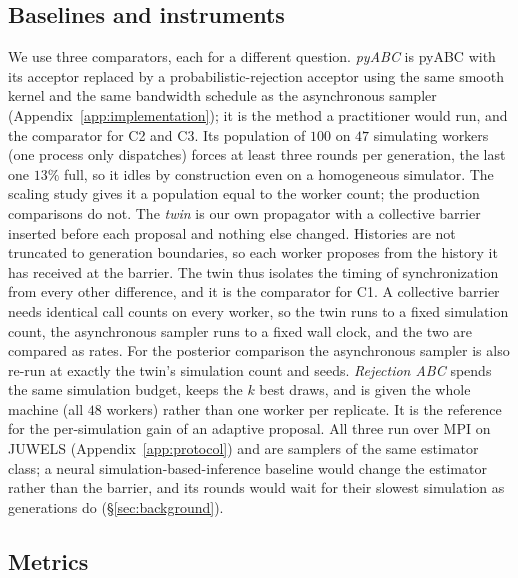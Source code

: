 \documentclass[10pt]{article}
\theoremstyle{plain}
\theoremstyle{definition}
\begin{document}
\subsection{Baselines and instruments}\label{sec:experiments-baselines}\label{sec:implementation}
We use three comparators, each for a different question. \emph{pyABC} is pyABC \citep{klinger2018pyabc,schalte2022pyabc} with its acceptor replaced by a probabilistic-rejection acceptor using the same smooth kernel and the same bandwidth schedule as the asynchronous sampler (Appendix~\ref{app:implementation}); it is the method a practitioner would run, and the comparator for C2 and C3. Its population of $100$ on $47$ simulating workers (one process only dispatches) forces at least three rounds per generation, the last one $13\%$ full, so it idles by construction even on a homogeneous simulator. The scaling study gives it a population equal to the worker count; the production comparisons do not. The \emph{twin} is our own propagator with a collective barrier inserted before each proposal and nothing else changed. Histories are not truncated to generation boundaries, so each worker proposes from the history it has received at the barrier. The twin thus isolates the timing of synchronization from every other difference, and it is the comparator for C1. A collective barrier needs identical call counts on every worker, so the twin runs to a fixed simulation count, the asynchronous sampler runs to a fixed wall clock, and the two are compared as rates. For the posterior comparison the asynchronous sampler is also re-run at exactly the twin's simulation count and seeds. \emph{Rejection ABC} spends the same simulation budget, keeps the $k$ best draws, and is given the whole machine (all $48$ workers) rather than one worker per replicate. It is the reference for the per-simulation gain of an adaptive proposal. All three run over MPI on JUWELS (Appendix~\ref{app:protocol}) and are samplers of the same estimator class; a neural simulation-based-inference baseline would change the estimator rather than the barrier, and its rounds would wait for their slowest simulation as generations do (\S\ref{sec:background}).

\subsection{Metrics}\label{sec:experiments-metrics}
\end{document}
